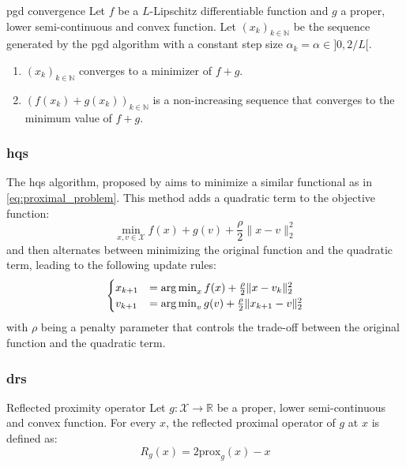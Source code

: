 \begin{theorem}{\acrshort{pgd} convergence \cite{Combettes2005}}
    Let $f$ be a $L$-Lipschitz differentiable function and $g$ a proper, lower semi-continuous and convex function. Let $(x_k)_{k \in \mathbb{N}}$ be the sequence generated by the \acrshort{pgd} algorithm with a constant step size $\alpha_k = \alpha \in ]0, 2/L[$.
    \begin{enumerate}
        \item $(x_k)_{k \in \mathbb{N}}$ converges to a minimizer of $f + g$.
        \item $(f(x_k) + g(x_k))_{k \in \mathbb{N}}$ is a non-increasing sequence that converges to the minimum value of $f + g$.
    \end{enumerate}
\end{theorem}

\subsubsection{\texorpdfstring{\acrfull{hqs}}{HQS}}

The \acrshort{hqs} algorithm, proposed by \cite{Geman1995} aims to minimize a similar functional as in \eqref{eq:proximal_problem}.
This method adds a quadratic term to the objective function:
\begin{equation}
    \min_{x, v \in \mathcal{X}} f(x) + g(v) + \frac{\rho}{2} \|x - v\|_2^2
\end{equation}
and then alternates between minimizing the original function and the quadratic term, leading to the following update rules:
\begin{equation}
    \begin{cases}
        x_{k+1} &= \mathop{\mathrm{arg\,min}}_x f(x) + \frac{\rho}{2} \|x - v_k\|_2^2 \\
        v_{k+1} &= \mathop{\mathrm{arg\,min}}_v g(v) + \frac{\rho}{2} \|x_{k+1} - v\|_2^2
    \end{cases}
\end{equation}
with $\rho$ being a penalty parameter that controls the trade-off between the original function and the quadratic term.

\subsubsection{\texorpdfstring{\acrfull{drs}}{DRS}}

\begin{definition}{Reflected proximity operator}
    Let $g: \mathcal{X} \to \mathbb{R}$ be a proper, lower semi-continuous and convex function.
    For every $x$, the reflected proximal operator of $g$ at $x$ is defined as:
    \begin{equation}
        R_g(x) = 2 \text{prox}_g(x) - x
    \end{equation}
    \label{def:reflected_proximal_operator}
\end{definition}

